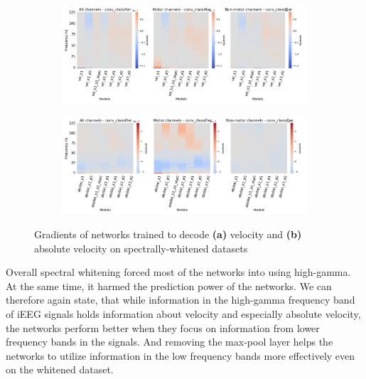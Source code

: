 \begin{figure}[!htbp]
\begin{subfigure}[a]{\textwidth}
   \includegraphics[width=1\linewidth]{img/ch4/vel-pw-last-layer-grads}
   \caption{}
   \label{fig:vel-pw-last-layer-grads}
\end{subfigure}

\begin{subfigure}[b]{\textwidth}
   \includegraphics[width=1\linewidth]{img/ch4/absVel-pw-last-layer-grads}
   \caption{}
   \label{fig:absVel-pw-last-layet-grads}
\end{subfigure}
\caption[Spectral whitening - gradients]{Gradients of networks trained to decode \textbf{(a)} velocity and \textbf{(b)} absolute velocity on spectrally-whitened datasets}
\label{fig:pw-last-layer-grads}
\end{figure}

Overall spectral whitening forced most of the networks into using high-gamma. 
At the same time, it harmed the prediction power of the networks.
We can therefore again state, that while information in the high-gamma frequency band of iEEG signals holds information about velocity and especially absolute velocity, the networks perform better when they focus on information from lower frequency bands in the signals. 
And removing the max-pool layer helps the networks to utilize information in the low frequency bands more effectively even on the whitened dataset.


